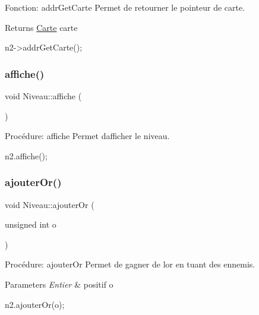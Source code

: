 Fonction\+: addr\+Get\+Carte Permet de retourner le pointeur de carte. 

\begin{DoxyReturn}{Returns}
\hyperlink{classCarte}{Carte} carte 
\begin{DoxyCode}
n2->addrGetCarte();
\end{DoxyCode}
 
\end{DoxyReturn}
\mbox{\label{classNiveau_a945a71fd635f9ab1e15dbae04afa5e5d}} 
\subsubsection{\texorpdfstring{affiche()}{affiche()}}
{\footnotesize\ttfamily void Niveau\+::affiche (\begin{DoxyParamCaption}{ }\end{DoxyParamCaption})}



Procédure\+: affiche Permet d\textquotesingle{}afficher le niveau. 


\begin{DoxyCode}
n2.affiche();
\end{DoxyCode}
 \mbox{\label{classNiveau_aca63b4ff95491069ebf5a8931ffc6d03}} 
\subsubsection{\texorpdfstring{ajouter\+Or()}{ajouterOr()}}
{\footnotesize\ttfamily void Niveau\+::ajouter\+Or (\begin{DoxyParamCaption}\item[{unsigned int}]{o }\end{DoxyParamCaption})}



Procédure\+: ajouter\+Or Permet de gagner de l\textquotesingle{}or en tuant des ennemis. 


\begin{DoxyParams}{Parameters}
{\em Entier} & positif o 
\begin{DoxyCode}
n2.ajouterOr(o);
\end{DoxyCode}
 \\
\hline
\end{DoxyParams}
\mbox{\label{classNiveau_ab43feae8b186ed6167b5cadaf2d01cac}} 
